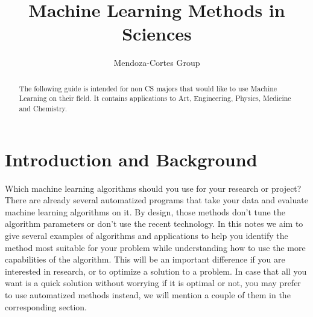 \documentclass[11pt,letterpaper]{report}
\author{Mendoza-Cortes Group}
\title{Machine Learning Methods in Sciences}
\begin{document}
	
	\setcounter{page}{1}
	\thispagestyle{empty}
	
	
	
	
	\maketitle
	
	\newpage
	
	\tableofcontents
	
	\listoftables
	
	\listoffigures
	
	
	\clearpage
	\newpage
	\setcounter{page}{1}
	\pagestyle{fancy}
	
	
	
	
	\begin{abstract}
		The following guide is intended for non CS majors that would like to use  Machine Learning on their field. It contains applications to Art, Engineering, Physics, Medicine and Chemistry.
	\end{abstract}
	
	\clearpage
	\newpage
	\chapter{Introduction and Background}
		Which machine learning algorithms should you use for your research or project? There are already several automatized programs  that take your data and evaluate machine learning algorithms on it. By design, those methods don't tune the algorithm parameters or don't use the recent technology. In this notes we aim to give several examples of algorithms and applications to help you identify the method most suitable for your problem while understanding how to use the more capabilities of the algorithm. This will be an important difference if you are interested in research, or to optimize a solution to a problem. In case that all you want is a quick solution without worrying if it is optimal or not, you may prefer to use automatized methods instead, we will mention a couple of them in the corresponding section. 
		
\end{document}
